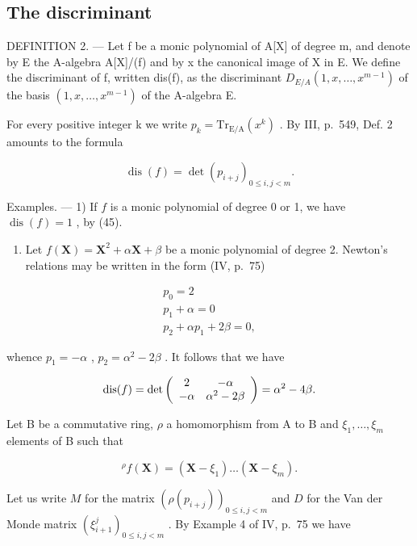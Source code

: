 \subsection{The discriminant}

DEFINITION 2. --- Let f be a monic polynomial of A{[}X{]} of degree m, and denote by E the A-algebra A{[}X{]}/(f) and by x the canonical image of X in E. We define the discriminant of f, written dis(f), as the discriminant \(D_{E/A}(1, x, \ldots, x^{m-1})\) of the basis \((1, x, \ldots, x^{m-1})\) of the A-algebra E.

For every positive integer k we write \(p_{k} = \mathrm{Tr}_{\mathrm{E}/\mathrm{A}}(x^{k})\) . By III, p.~549, Def. 2 amounts to the formula

\[
\operatorname{dis} (f) = \det \left(p _ {i + j}\right) _ {0 \leqslant i, j <   m}.\tag{45}
\]

Examples. --- 1) If \(f\) is a monic polynomial of degree 0 or 1, we have \(\operatorname{dis}(f) = 1\) , by (45).

\begin{enumerate}
\def\labelenumi{\arabic{enumi})}
\setcounter{enumi}{1}
\tightlist
\item
  Let \(f(\mathbf{X}) = \mathbf{X}^2 + \alpha \mathbf{X} + \beta\) be a monic polynomial of degree 2. Newton's relations may be written in the form (IV, p.~75)
\end{enumerate}

\[
\begin{array}{c} p _ {0} = 2 \\ p _ {1} + \alpha = 0 \\ p _ {2} + \alpha p _ {1} + 2 \beta = 0, \end{array}
\]

whence \(p_1 = -\alpha\) , \(p_2 = \alpha^2 - 2\beta\) . It follows that we have

\[
\operatorname{dis} (f) = \det \left( \begin{array}{c c} 2 & - \alpha \\ - \alpha & \alpha^ {2} - 2 \beta \end{array} \right) = \alpha^ {2} - 4 \beta .
\]

Let B be a commutative ring, \(\rho\) a homomorphism from A to B and \(\xi_{1}, \ldots, \xi_{m}\) elements of B such that

\[
{ } ^ { \rho } f ( \mathbf { X } ) = ( \mathbf { X } - \xi _ { 1 } ) \dots ( \mathbf { X } - \xi _ { m } ) .
\]

Let us write \(M\) for the matrix \((\rho(p_{i+j}))_{0 \leqslant i,j < m}\) and \(D\) for the Van der Monde matrix \((\xi_{i+1}^{j})_{0 \leqslant i,j < m}\) . By Example 4 of IV, p.~75 we have

